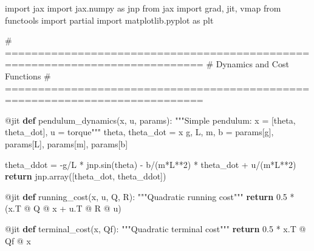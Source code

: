 \documentclass[
  letterpaper,
  DIV=11,
  numbers=noendperiod]{scrartcl}
\newenvironment{Shaded}{\begin{snugshade}}{\end{snugshade}}
\newcommand{\AttributeTok}[1]{\textcolor[rgb]{0.40,0.45,0.13}{#1}}
\newcommand{\CommentTok}[1]{\textcolor[rgb]{0.37,0.37,0.37}{#1}}
\newcommand{\ControlFlowTok}[1]{\textcolor[rgb]{0.00,0.23,0.31}{\textbf{#1}}}
\newcommand{\DecValTok}[1]{\textcolor[rgb]{0.68,0.00,0.00}{#1}}
\newcommand{\FloatTok}[1]{\textcolor[rgb]{0.68,0.00,0.00}{#1}}
\newcommand{\ImportTok}[1]{\textcolor[rgb]{0.00,0.46,0.62}{#1}}
\newcommand{\KeywordTok}[1]{\textcolor[rgb]{0.00,0.23,0.31}{\textbf{#1}}}
\newcommand{\NormalTok}[1]{\textcolor[rgb]{0.00,0.23,0.31}{#1}}
\newcommand{\OperatorTok}[1]{\textcolor[rgb]{0.37,0.37,0.37}{#1}}
\newcommand{\StringTok}[1]{\textcolor[rgb]{0.13,0.47,0.30}{#1}}
\begin{document}
\begin{Shaded}
\begin{Highlighting}[]
\ImportTok{import}\NormalTok{ jax}
\ImportTok{import}\NormalTok{ jax.numpy }\ImportTok{as}\NormalTok{ jnp}
\ImportTok{from}\NormalTok{ jax }\ImportTok{import}\NormalTok{ grad, jit, vmap}
\ImportTok{from}\NormalTok{ functools }\ImportTok{import}\NormalTok{ partial}
\ImportTok{import}\NormalTok{ matplotlib.pyplot }\ImportTok{as}\NormalTok{ plt}

\CommentTok{\# ============================================================================}
\CommentTok{\# Dynamics and Cost Functions}
\CommentTok{\# ============================================================================}

\AttributeTok{@jit}
\KeywordTok{def}\NormalTok{ pendulum\_dynamics(x, u, params):}
    \CommentTok{"""Simple pendulum: x = [theta, theta\_dot], u = torque"""}
\NormalTok{    theta, theta\_dot }\OperatorTok{=}\NormalTok{ x}
\NormalTok{    g, L, m, b }\OperatorTok{=}\NormalTok{ params[}\StringTok{\textquotesingle{}g\textquotesingle{}}\NormalTok{], params[}\StringTok{\textquotesingle{}L\textquotesingle{}}\NormalTok{], params[}\StringTok{\textquotesingle{}m\textquotesingle{}}\NormalTok{], params[}\StringTok{\textquotesingle{}b\textquotesingle{}}\NormalTok{]}

\NormalTok{    theta\_ddot }\OperatorTok{=} \OperatorTok{{-}}\NormalTok{g}\OperatorTok{/}\NormalTok{L }\OperatorTok{*}\NormalTok{ jnp.sin(theta) }\OperatorTok{{-}}\NormalTok{ b}\OperatorTok{/}\NormalTok{(m}\OperatorTok{*}\NormalTok{L}\OperatorTok{**}\DecValTok{2}\NormalTok{) }\OperatorTok{*}\NormalTok{ theta\_dot }\OperatorTok{+}\NormalTok{ u}\OperatorTok{/}\NormalTok{(m}\OperatorTok{*}\NormalTok{L}\OperatorTok{**}\DecValTok{2}\NormalTok{)}
    \ControlFlowTok{return}\NormalTok{ jnp.array([theta\_dot, theta\_ddot])}

\AttributeTok{@jit}
\KeywordTok{def}\NormalTok{ running\_cost(x, u, Q, R):}
    \CommentTok{"""Quadratic running cost"""}
    \ControlFlowTok{return} \FloatTok{0.5} \OperatorTok{*}\NormalTok{ (x.T }\OperatorTok{@}\NormalTok{ Q }\OperatorTok{@}\NormalTok{ x }\OperatorTok{+}\NormalTok{ u.T }\OperatorTok{@}\NormalTok{ R }\OperatorTok{@}\NormalTok{ u)}

\AttributeTok{@jit}
\KeywordTok{def}\NormalTok{ terminal\_cost(x, Qf):}
    \CommentTok{"""Quadratic terminal cost"""}
    \ControlFlowTok{return} \FloatTok{0.5} \OperatorTok{*}\NormalTok{ x.T }\OperatorTok{@}\NormalTok{ Qf }\OperatorTok{@}\NormalTok{ x}


\end{Highlighting}
\end{Shaded}
\end{document}
